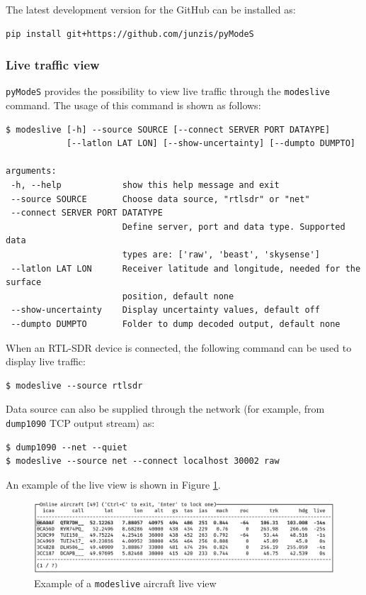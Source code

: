 The latest development version for the GitHub can be installed as:

\begin{verbatim}
pip install git+https://github.com/junzis/pyModeS
\end{verbatim}


\subsubsection{Live traffic view}

\texttt{pyModeS} provides the possibility to view live traffic through the \texttt{modeslive} command. The usage of this command is shown as follows:

\begin{verbatim}
$ modeslive [-h] --source SOURCE [--connect SERVER PORT DATAYPE]
            [--latlon LAT LON] [--show-uncertainty] [--dumpto DUMPTO]

arguments:
 -h, --help            show this help message and exit
 --source SOURCE       Choose data source, "rtlsdr" or "net"
 --connect SERVER PORT DATATYPE
                       Define server, port and data type. Supported data
                       types are: ['raw', 'beast', 'skysense']
 --latlon LAT LON      Receiver latitude and longitude, needed for the surface
                       position, default none
 --show-uncertainty    Display uncertainty values, default off
 --dumpto DUMPTO       Folder to dump decoded output, default none
\end{verbatim}

When an RTL-SDR device is connected, the following command can be used to display live traffic:

\begin{verbatim}
$ modeslive --source rtlsdr
\end{verbatim}

Data source can also be supplied through the network (for example, from \texttt{dump1090} TCP output stream) as:



\begin{verbatim}
$ dump1090 --net --quiet
$ modeslive --source net --connect localhost 30002 raw
\end{verbatim}

An example of the live view is shown in Figure \ref{fig:modeslive}.

\begin{figure}[ht]
  \centering
  \includegraphics[scale=0.3]{figures/quickstart/modeslive.png}
  \caption{Example of a \texttt{modeslive} aircraft live view}
  \label{fig:modeslive}
\end{figure}


